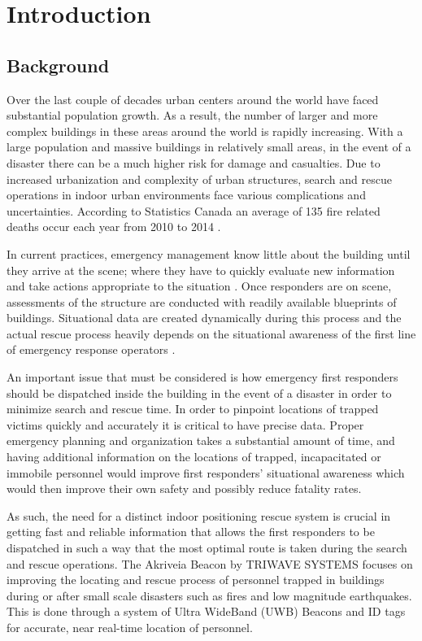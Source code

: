 
\setcounter{section}{0}
\section{Introduction}
\bigskip

\subsection{Background}
Over the last couple of decades urban centers around the world have faced substantial population growth. As a result, the number of larger and more complex buildings in these areas around the world is rapidly increasing. With a large population and massive buildings in relatively small areas, in the event of a disaster there can be a much higher risk for damage and casualties. Due to increased urbanization and complexity of urban structures, search and rescue operations in indoor urban environments face various complications and uncertainties. According to Statistics Canada an average of 135 fire related deaths occur each year from 2010 to 2014 \cite{R1}.

\bigskip
In current practices, emergency management know little about the building until they arrive at the scene; where they have to quickly evaluate new information and take actions appropriate to the situation \cite{R2}. Once responders are on scene, assessments of the structure are conducted with readily available blueprints of buildings. Situational data are created dynamically during this process and the actual rescue process heavily depends on the situational awareness of the first line of emergency response operators \cite{R3}.

\bigskip
An important issue that must be considered is how emergency first responders should be dispatched inside the building in the event of a disaster in order to minimize search and rescue time. In order to pinpoint locations of trapped victims quickly and accurately it is critical to have precise data. Proper emergency planning and organization takes a substantial amount of time, and having additional information on the locations of trapped, incapacitated or immobile personnel would improve first responders’ situational awareness which would then improve their own safety and possibly reduce fatality rates.

\bigskip
As such, the need for a distinct indoor positioning rescue system is crucial in getting fast and reliable information that allows the first responders to be dispatched in such a way that the most optimal route is taken during the search and rescue operations. The Akriveia Beacon by TRIWAVE SYSTEMS focuses on improving the locating and rescue process of personnel trapped in buildings during or after small scale disasters such as fires and low magnitude earthquakes. This is done through a system of Ultra WideBand (\Gls{UWB}) Beacons and \Gls{ID} tags for accurate, near real-time location of personnel.

